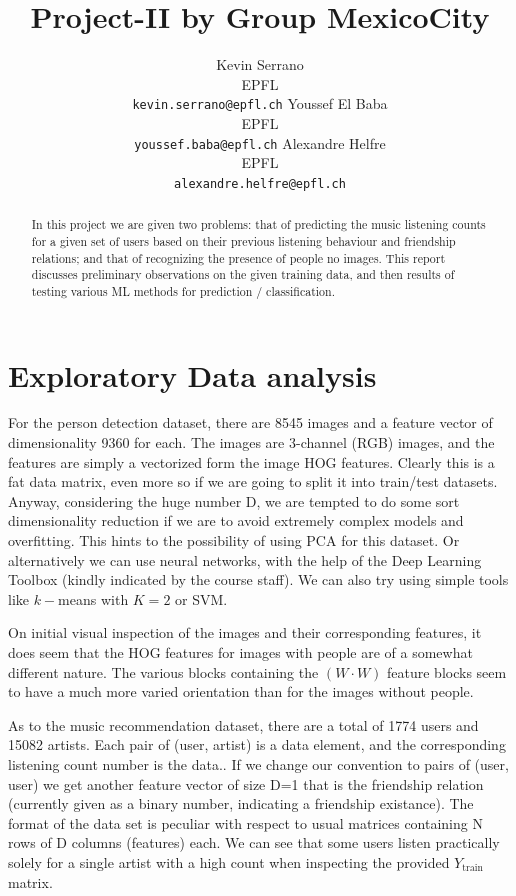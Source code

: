 \documentclass{article} %
\title{Project-II by Group MexicoCity}
\author{
Kevin Serrano\\EPFL\\
\texttt{kevin.serrano@epfl.ch} \And Youssef El Baba\\EPFL\\
\texttt{youssef.baba@epfl.ch} \And Alexandre Helfre\\EPFL\\
\texttt{alexandre.helfre@epfl.ch}
}
\begin{document}
\maketitle

\begin{abstract}
In this project we are given two problems: that of predicting the music listening counts for a given set of users based on their previous listening behaviour and friendship relations; and that of recognizing the presence of people no images. This report discusses preliminary observations on the given training data, and then results of testing various ML methods for prediction / classification.
\end{abstract}

\section{Exploratory Data analysis}
\label{sec:datadescr}
For the person detection dataset, there are 8545 images and a feature vector of dimensionality 9360 for each. The images are 3-channel (RGB) images, and the features are simply a vectorized form the image HOG features. Clearly this is a fat data matrix, even more so if we are going to split it into train/test datasets. Anyway, considering the huge number D, we are tempted to do some sort dimensionality reduction if we are to avoid extremely complex models and overfitting. This hints to the possibility of using PCA for this dataset. Or alternatively we can use neural networks, with the help of the Deep Learning Toolbox (kindly indicated by the course staff). We can also try using simple tools like $k-$means with $K = 2$ or SVM.

On initial visual inspection of the images and their corresponding features, it does seem that the HOG features for images with people are of a somewhat different nature. The various blocks containing the $(W \cdot W)$ feature blocks seem to have a much more varied orientation than for the images without people.

As to the music recommendation dataset, there are a total of 1774 users and 15082 artists. Each pair of (user, artist) is a data element, and the corresponding listening count number is the data.. If we change our convention to pairs of (user, user) we get another feature vector of size D=1 that is the friendship relation (currently given as a binary number, indicating a friendship existance). The format of the data set is peculiar with respect to usual matrices containing N rows of D columns (features) each. We can see that some users listen practically solely for a single artist with a high count when inspecting the provided $Y_{\text{train}}$ matrix.
\end{document}
